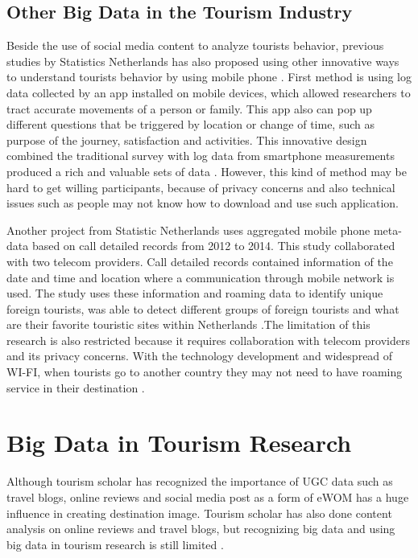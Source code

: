 \documentclass[sigconf]{acmart}
\begin{document}
\subsection{Other Big Data in the Tourism Industry}
Beside the use of social media content to analyze tourists behavior, previous studies
by Statistics Netherlands has also proposed using other innovative ways to understand
tourists behavior by using mobile phone \cite{heerschap2014innovation}. First method
is using log data collected by an app installed on mobile devices, which allowed
researchers to tract accurate movements of a person or family. This app also can pop
up different questions that be triggered by location or change of time, such as
purpose of the journey, satisfaction and activities. This innovative design combined
the traditional survey with log data from smartphone measurements produced a rich and
valuable sets of data \cite{heerschap2014innovation}. However, this kind of method may
be hard to get willing participants, because of privacy concerns and also technical
issues such as people may not know how to download and use such application.

Another project from Statistic Netherlands uses aggregated mobile phone meta-data
based on call detailed records from 2012 to 2014. This study collaborated with two
telecom providers. Call detailed records contained information of the date and time
and location where a communication through mobile network is used. The study uses
these information and roaming data to identify unique foreign tourists, was able to
detect different groups of foreign tourists and what are their favorite touristic
sites within Netherlands \cite{heerschap2014innovation}.The limitation of this
research is also restricted because it requires collaboration with telecom providers
and its privacy concerns. With the technology development and widespread of WI-FI,
when tourists go to another country they may not need to have roaming service in their
destination \cite{heerschap2014innovation}.   


\section{Big Data in Tourism Research}
Although tourism scholar has recognized the importance of UGC data such as travel
blogs, online reviews and social media post as a form of eWOM has a huge influence in
creating destination image. Tourism scholar has also done content analysis on online
reviews and travel blogs, but recognizing big data and using big data in tourism
research is still limited \cite{Williams201787,chung2009}. 
\end{document}
